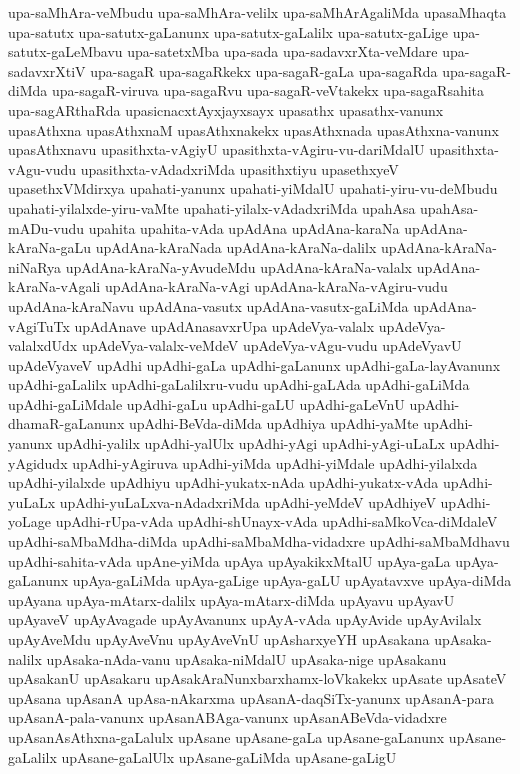 {upa-saMhAra-veMbudu
upa-saMhAra-velilx
upa-saMhArAgaliMda
upasaMhaqta
upa-satutx
upa-satutx-gaLanunx
upa-satutx-gaLalilx
upa-satutx-gaLige
upa-satutx-gaLeMbavu
upa-satetxMba
upa-sada
upa-sadavxrXta-veMdare
upa-sadavxrXtiV
upa-sagaR
upa-sagaRkekx
upa-sagaR-gaLa
upa-sagaRda
upa-sagaR-diMda
upa-sagaR-viruva
upa-sagaRvu
upa-sagaR-veVtakekx
upa-sagaRsahita
upa-sagARthaRda
upasicnacxtAyxjayxsayx
upasathx
upasathx-vanunx
upasAthxna
upasAthxnaM
upasAthxnakekx
upasAthxnada
upasAthxna-vanunx
upasAthxnavu
upasithxta-vAgiyU
upasithxta-vAgiru-vu-dariMdalU
upasithxta-vAgu-vudu
upasithxta-vAdadxriMda
upasithxtiyu
upasethxyeV
upasethxVMdirxya
upahati-yanunx
upahati-yiMdalU
upahati-yiru-vu-deMbudu
upahati-yilalxde-yiru-vaMte
upahati-yilalx-vAdadxriMda
upahAsa
upahAsa-mADu-vudu
upahita
upahita-vAda
upAdAna
upAdAna-karaNa
upAdAna-kAraNa-gaLu
upAdAna-kAraNada
upAdAna-kAraNa-dalilx
upAdAna-kAraNa-niNaRya
upAdAna-kAraNa-yAvudeMdu
upAdAna-kAraNa-valalx
upAdAna-kAraNa-vAgali
upAdAna-kAraNa-vAgi
upAdAna-kAraNa-vAgiru-vudu
upAdAna-kAraNavu
upAdAna-vasutx
upAdAna-vasutx-gaLiMda
upAdAna-vAgiTuTx
upAdAnave
upAdAnasavxrUpa
upAdeVya-valalx
upAdeVya-valalxdUdx
upAdeVya-valalx-veMdeV
upAdeVya-vAgu-vudu
upAdeVyavU
upAdeVyaveV
upAdhi
upAdhi-gaLa
upAdhi-gaLanunx
upAdhi-gaLa-layAvanunx
upAdhi-gaLalilx
upAdhi-gaLalilxru-vudu
upAdhi-gaLAda
upAdhi-gaLiMda
upAdhi-gaLiMdale
upAdhi-gaLu
upAdhi-gaLU
upAdhi-gaLeVnU
upAdhi-dhamaR-gaLanunx
upAdhi-BeVda-diMda
upAdhiya
upAdhi-yaMte
upAdhi-yanunx
upAdhi-yalilx
upAdhi-yalUlx
upAdhi-yAgi
upAdhi-yAgi-uLaLx
upAdhi-yAgidudx
upAdhi-yAgiruva
upAdhi-yiMda
upAdhi-yiMdale
upAdhi-yilalxda
upAdhi-yilalxde
upAdhiyu
upAdhi-yukatx-nAda
upAdhi-yukatx-vAda
upAdhi-yuLaLx
upAdhi-yuLaLxva-nAdadxriMda
upAdhi-yeMdeV
upAdhiyeV
upAdhi-yoLage
upAdhi-rUpa-vAda
upAdhi-shUnayx-vAda
upAdhi-saMkoVca-diMdaleV
upAdhi-saMbaMdha-diMda
upAdhi-saMbaMdha-vidadxre
upAdhi-saMbaMdhavu
upAdhi-sahita-vAda
upAne-yiMda
upAya
upAyakikxMtalU
upAya-gaLa
upAya-gaLanunx
upAya-gaLiMda
upAya-gaLige
upAya-gaLU
upAyatavxve
upAya-diMda
upAyana
upAya-mAtarx-dalilx
upAya-mAtarx-diMda
upAyavu
upAyavU
upAyaveV
upAyAvagade
upAyAvanunx
upAyA-vAda
upAyAvide
upAyAvilalx
upAyAveMdu
upAyAveVnu
upAyAveVnU
upAsharxyeYH
upAsakana
upAsaka-nalilx
upAsaka-nAda-vanu
upAsaka-niMdalU
upAsaka-nige
upAsakanu
upAsakanU
upAsakaru
upAsakAraNunxbarxhamx-loVkakekx
upAsate
upAsateV
upAsana
upAsanA
upAsa-nAkarxma
upAsanA-daqSiTx-yanunx
upAsanA-para
upAsanA-pala-vanunx
upAsanABAga-vanunx
upAsanABeVda-vidadxre
upAsanAsAthxna-gaLalulx
upAsane
upAsane-gaLa
upAsane-gaLanunx
upAsane-gaLalilx
upAsane-gaLalUlx
upAsane-gaLiMda
upAsane-gaLigU
}
